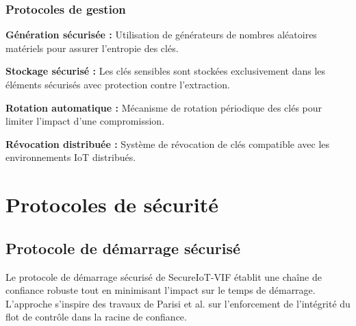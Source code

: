 \subsubsection{Protocoles de gestion}

\textbf{Génération sécurisée :} Utilisation de générateurs de nombres aléatoires matériels pour assurer l'entropie des clés.

\textbf{Stockage sécurisé :} Les clés sensibles sont stockées exclusivement dans les éléments sécurisés avec protection contre l'extraction.

\textbf{Rotation automatique :} Mécanisme de rotation périodique des clés pour limiter l'impact d'une compromission.

\textbf{Révocation distribuée :} Système de révocation de clés compatible avec les environnements IoT distribués.

\section{Protocoles de sécurité}

\subsection{Protocole de démarrage sécurisé}

Le protocole de démarrage sécurisé de SecureIoT-VIF établit une chaîne de confiance robuste tout en minimisant l'impact sur le temps de démarrage. L'approche s'inspire des travaux de Parisi et al. \cite{Parisi2024TitanCFI} sur l'enforcement de l'intégrité du flot de contrôle dans la racine de confiance.

